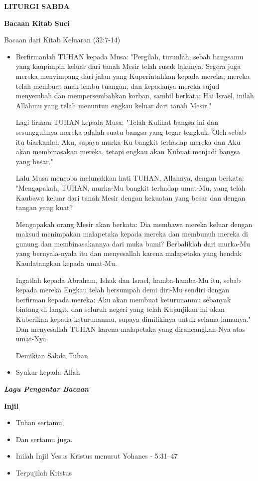 \documentclass[12pt,twoside]{book}
\makeatletter
\newcommand{\judul}[1]{%
  {\parindent \z@ \centering \normalfont
    \interlinepenalty\@M \large \bfseries #1\par\nobreak \vskip 20\p@ }}
\newcommand{\subjudul}[1]{%
  {\parindent \z@ \normalfont
    \interlinepenalty\@M \bfseries #1\par\nobreak \vskip 20\p@ }}
\newcommand{\lagu}[1]{%
  {\parindent \z@ \normalfont
    \interlinepenalty\@M \bfseries \emph{#1}\par\nobreak \vskip 20\p@ }}
\newcommand{\BU}[1]{\begin{itemize} \item[U:] #1 \end{itemize}}
\newcommand{\BI}[1]{\begin{itemize} \item[I:] #1 \end{itemize}}
\newcommand{\BP}[1]{\begin{itemize} \item[P:] #1 \end{itemize}}
\makeatother
\begin{document}
\judul{LITURGI SABDA}

\subjudul{Bacaan Kitab Suci}

Bacaan dari Kitab Keluaran (32:7-14)

\BP{Berfirmanlah TUHAN kepada Musa: "Pergilah, turunlah, sebab bangsamu yang kaupimpin keluar dari tanah Mesir telah rusak lakunya.
Segera juga mereka menyimpang dari jalan yang Kuperintahkan kepada mereka; mereka telah membuat anak lembu tuangan, dan kepadanya mereka sujud menyembah dan mempersembahkan korban, sambil berkata: Hai Israel, inilah Allahmu yang telah menuntun engkau keluar dari tanah Mesir."

Lagi firman TUHAN kepada Musa: "Telah Kulihat bangsa ini dan sesungguhnya mereka adalah suatu bangsa yang tegar tengkuk.
Oleh sebab itu biarkanlah Aku, supaya murka-Ku bangkit terhadap mereka dan Aku akan membinasakan mereka, tetapi engkau akan Kubuat menjadi bangsa yang besar."

Lalu Musa mencoba melunakkan hati TUHAN, Allahnya, dengan berkata: "Mengapakah, TUHAN, murka-Mu bangkit terhadap umat-Mu, yang telah Kaubawa keluar dari tanah Mesir dengan kekuatan yang besar dan dengan tangan yang kuat?

Mengapakah orang Mesir akan berkata: Dia membawa mereka keluar dengan maksud menimpakan malapetaka kepada mereka dan membunuh mereka di gunung dan membinasakannya dari muka bumi? Berbaliklah dari murka-Mu yang bernyala-nyala itu dan menyesallah karena malapetaka yang hendak Kaudatangkan kepada umat-Mu.

Ingatlah kepada Abraham, Ishak dan Israel, hamba-hamba-Mu itu, sebab kepada mereka Engkau telah bersumpah demi diri-Mu sendiri dengan berfirman kepada mereka: Aku akan membuat keturunanmu sebanyak bintang di langit, dan seluruh negeri yang telah Kujanjikan ini akan Kuberikan kepada keturunanmu, supaya dimilikinya untuk selama-lamanya."
Dan menyesallah TUHAN karena malapetaka yang dirancangkan-Nya atas umat-Nya.

Demikian Sabda Tuhan}

\BU{Syukur kepada Allah}

\lagu{Lagu Pengantar Bacaan}



\subjudul{Injil}
\BI{Tuhan sertamu,}
\BU{Dan sertamu juga.}
\BI{Inilah Injil Yesus Kristus menurut Yohanes - 5:31--47}
\BU{Terpujilah Kristus}
\end{document}
